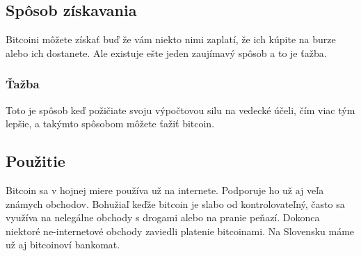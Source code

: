 \subsection{Spôsob získavania}
Bitcoini môžete získať buď že vám niekto nimi zaplatí, že ich kúpite na burze alebo ich dostanete. Ale existuje ešte jeden zaujímavý spôsob a to je ťažba.
\subsubsection{Ťažba}
Toto je spôsob keď požičiate svoju výpočtovou silu na vedecké účeli, čím viac tým lepšie, a takýmto spôsobom môžete ťažiť bitcoin.
\subsection{Použitie}
Bitcoin sa v hojnej miere používa už na internete. Podporuje ho už aj veľa známych obchodov. Bohužiaľ keďže bitcoin je slabo od kontrolovateľný,
 často sa využíva na nelegálne obchody s drogami alebo na pranie peňazí. Dokonca niektoré ne-internetové obchody zaviedli platenie bitcoinami. Na Slovensku máme už aj bitcoinoví bankomat. 
\cite{B} 
